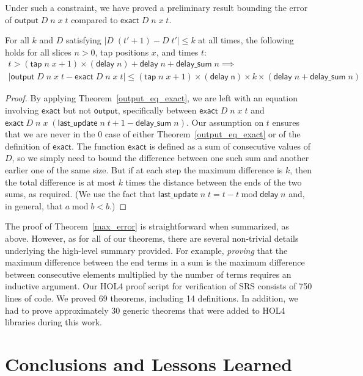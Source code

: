 \documentclass{llncs}
\begin{document}
Under such a constraint, we have proved a preliminary result bounding the error of $\mathsf{output}\;D\;n\;x\;t$ compared to $\mathsf{exact}\;D\;n\;x\;t$.
\begin{theorem}\label{max_error}
For all $k$ and $D$ satisfying $|D\;(t'+1)-D\;t'|\leq k$ at all times, the following holds for all slices $n>0$, tap positions $x$, and times $t$:
\begin{multline*}
t>(\mathsf{tap}\;n\;x+1)\times(\mathsf{delay}\;n)+\mathsf{delay}\;n+\mathsf{delay\_sum}\;n\implies\\
|\mathsf{output}\;D\;n\;x\;t-\mathsf{exact}\;D\;n\;x\;t|\leq(\mathsf{tap}\;n\;x+1)\times(\mathsf{delay\;n})\times k\times(\mathsf{delay}\;n+\mathsf{delay\_sum}\;n)
\end{multline*}
\end{theorem}
\begin{proof}
By applying Theorem~\ref{output_eq_exact}, we are left with an equation involving $\mathsf{exact}$ but not $\mathsf{output}$, specifically between $\mathsf{exact}\;D\;n\;x\;t$ and $\mathsf{exact}\;D\;n\;x\;(\mathsf{last\_update}\;n\;t+1-\mathsf{delay\_sum}\;n)$.
Our assumption on $t$ ensures that we are never in the $0$ case of either Theorem~\ref{output_eq_exact} or of the definition of $\mathsf{exact}$.
The function $\mathsf{exact}$ is defined as a sum of consecutive values of $D$, so we simply need to bound the difference between one such sum and another earlier one of the same size.
But if at each step the maximum difference is $k$, then the total difference is at most $k$ times the distance between the ends of the two sums, as required.
(We use the fact that $\mathsf{last\_update}\;n\;t=t-t\operatorname{mod}\mathsf{delay}\;n$ and, in general, that $a\operatorname{mod}b<b$.)
\end{proof}

The proof of Theorem~\ref{max_error} is straightforward when summarized, as above.
However, as for all of our theorems, there are several non-trivial details underlying the high-level summary provided.
For example, \emph{proving} that the maximum difference between the end terms in a sum is the maximum difference between consecutive elements multiplied by the number of terms requires an inductive argument.
Our HOL4 proof script for verification of SRS consists of 750 lines of code.
We proved 69 theorems, including 14 definitions.
In addition, we had to prove approximately 30 generic theorems that were added to HOL4 libraries during this work.

\section{Conclusions and Lessons Learned}
\label{sec-conclusions}
\end{document}
